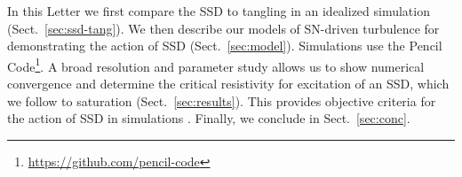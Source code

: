 \documentclass[preprint2]{aastex63}
\newcommand{\fg}[1]{\textcolor{midgreen}{#1}}
\begin{document}
 In this {\fg L}etter we \fg{first} compare the SSD to tangling in an idealized
 simulation (Sect.~\ref{sec:ssd-tang})\fg{.
 We then describe our models of SN-driven turbulence for demonstrating the
 action of SSD (Sect.~\ref{sec:model}).} 
 \fg{Simulations} use the {\sc Pencil Code}\footnote{
 \href{https://github.com/pencil-code}{https://github.com/pencil-code}}.
 A broad resolution and parameter study allows us to \fg{show numerical}
 \fg{convergence and} \fg{determine} the critical resistivity for excitation
 of an SSD, \fg{which we follow} to saturation (Sect.~\ref{sec:results}).
 This provides objective criteria \fg{for the action} of SSD in simulations
 \citep[such as][]{Gent:2013b,GE20,SBADMN19}.
 Finally, we conclude in Sect.~\ref{sec:conc}.
\end{document}
